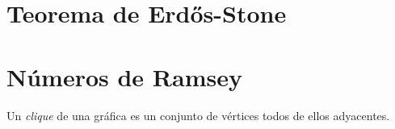 \section{Teorema de Erdős-Stone}

\section{Números de Ramsey}
Un \textit{clique} de una gráfica es un conjunto de vértices todos de ellos adyacentes.
